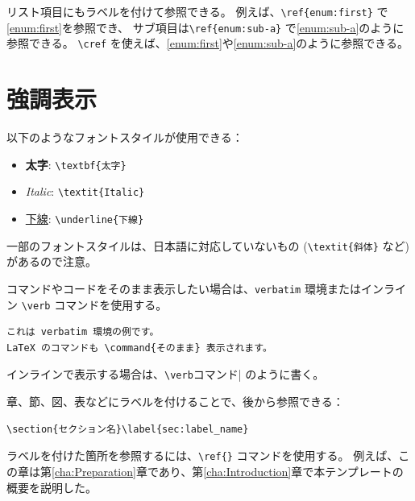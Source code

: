 リスト項目にもラベルを付けて参照できる。
例えば、\verb|\ref{enum:first}| で\ref{enum:first}を参照でき、
サブ項目は\verb|\ref{enum:sub-a}| で\ref{enum:sub-a}のように参照できる。
\verb|\cref| を使えば、\cref{enum:first}や\cref{enum:sub-a}のように参照できる。

\section{強調表示}

以下のようなフォントスタイルが使用できる：

\begin{itemize}
  \item \textbf{太字}: \verb|\textbf{太字}|
  \item \textit{Italic}: \verb|\textit{Italic}|
  \item \underline{下線}: \verb|\underline{下線}|
\end{itemize}

一部のフォントスタイルは、日本語に対応していないもの (\verb|\textit{斜体}| など) があるので注意。


コマンドやコードをそのまま表示したい場合は、\verb|verbatim| 環境またはインライン \verb|\verb| コマンドを使用する。

\begin{verbatim}
これは verbatim 環境の例です。
LaTeX のコマンドも \command{そのまま} 表示されます。
\end{verbatim}

インラインで表示する場合は、\verb|\verb|コマンド| のように書く。



章、節、図、表などにラベルを付けることで、後から参照できる：

\begin{verbatim}
\section{セクション名}\label{sec:label_name}
\end{verbatim}


ラベルを付けた箇所を参照するには、\verb|\ref{}| コマンドを使用する。
例えば、この章は第\ref{cha:Preparation}章であり、第\ref{cha:Introduction}章で本テンプレートの概要を説明した。
\fi